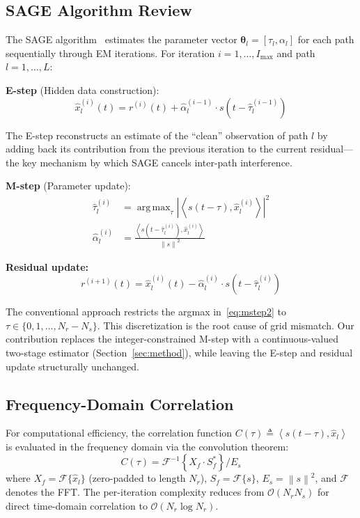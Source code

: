 \documentclass[journal]{IEEEtran}
\DeclareMathOperator*{\argmax}{arg\,max}
\newcommand{\Fc}{\mathcal{F}}
\newcommand{\bigO}{\mathcal{O}}
\newcommand{\norm}[1]{\left\lVert #1 \right\rVert}
\newcommand{\abs}[1]{\left| #1 \right|}
\newcommand{\inner}[2]{\left\langle #1, #2 \right\rangle}
\newcommand{\hb}[1]{\hat{#1}}
\begin{document}
\subsection{SAGE Algorithm Review}

The SAGE algorithm~\cite{fleury1999} estimates the parameter vector $\bm{\theta}_l = [\tau_l, \alpha_l]$ for each path sequentially through EM iterations. For iteration $i = 1, \ldots, I_{\max}$ and path $l = 1, \ldots, L$:

\textbf{E-step} (Hidden data construction):
\begin{equation}
\hb{x}_l^{(i)}(t) = r^{(i)}(t) + \hb{\alpha}_l^{(i-1)} \cdot s\!\left(t - \hb{\tau}_l^{(i-1)}\right)
\label{eq:estep}
\end{equation}

The E-step reconstructs an estimate of the ``clean'' observation of path $l$ by adding back its contribution from the previous iteration to the current residual---the key mechanism by which SAGE cancels inter-path interference.

\textbf{M-step} (Parameter update):
\begin{align}
\hb{\tau}_l^{(i)} &= \argmax_{\tau} \abs{\inner{s(t-\tau)}{\hb{x}_l^{(i)}}}^2 \label{eq:mstep2} \\
\hb{\alpha}_l^{(i)} &= \frac{\inner{s(t-\hb{\tau}_l^{(i)})}{\hb{x}_l^{(i)}}}{\norm{s}^2} \label{eq:amp}
\end{align}

\textbf{Residual update:}
\begin{equation}
r^{(i+1)}(t) = \hb{x}_l^{(i)}(t) - \hb{\alpha}_l^{(i)} \cdot s\!\left(t - \hb{\tau}_l^{(i)}\right)
\label{eq:resid}
\end{equation}

The conventional approach restricts the argmax in~\eqref{eq:mstep2} to $\tau \in \{0, 1, \ldots, N_r - N_s\}$. This discretization is the root cause of grid mismatch. Our contribution replaces the integer-constrained M-step with a continuous-valued two-stage estimator (Section~\ref{sec:method}), while leaving the E-step and residual update structurally unchanged.

\subsection{Frequency-Domain Correlation}

For computational efficiency, the correlation function $C(\tau) \triangleq \inner{s(t-\tau)}{\hb{x}_l}$ is evaluated in the frequency domain via the convolution theorem:
\begin{equation}
C(\tau) = \Fc^{-1}\!\left\{ X_f \cdot S_f^* \right\} / E_s
\label{eq:fftcorr}
\end{equation}
where $X_f = \Fc\{\hb{x}_l\}$ (zero-padded to length $N_r$), $S_f = \Fc\{s\}$, $E_s = \norm{s}^2$, and $\Fc$ denotes the FFT. The per-iteration complexity reduces from $\bigO(N_r N_s)$ for direct time-domain correlation to $\bigO(N_r \log N_r)$.
\end{document}
